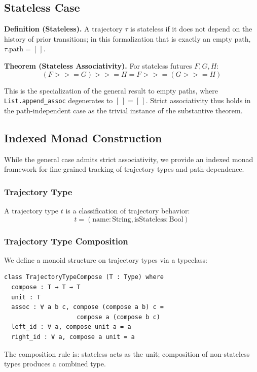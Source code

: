 \documentclass[11pt,a4paper]{article}
\newcommand{\seqBind}{\mathbin{>>=}}
\begin{document}
\subsection{Stateless Case}

\textbf{Definition (Stateless).} A trajectory $\tau$ is stateless if it does
not depend on the history of prior transitions; in this formalization that is
exactly an empty path, $\tau.\text{path} = [\,]$.

\textbf{Theorem (Stateless Associativity).} For stateless futures $F, G, H$:
\[
(F \seqBind G) \seqBind H = F \seqBind (G \seqBind H)
\]

This is the specialization of the general result to empty paths, where
\texttt{List.append\_assoc} degenerates to $[\,] = [\,]$. Strict associativity
thus holds in the path-independent case as the trivial instance of the
substantive theorem.

\subsection{Indexed Monad Construction}

While the general case admits strict associativity, we provide an indexed monad framework for fine-grained tracking of trajectory types and path-dependence.

\subsubsection{Trajectory Type}

A trajectory type $t$ is a classification of trajectory behavior:
\[
t = (\text{name} : \text{String}, \text{isStateless} : \text{Bool})
\]

\subsubsection{Trajectory Type Composition}

We define a monoid structure on trajectory types via a typeclass:
\begin{lstlisting}
class TrajectoryTypeCompose (T : Type) where
  compose : T → T → T
  unit : T
  assoc : ∀ a b c, compose (compose a b) c = 
                    compose a (compose b c)
  left_id : ∀ a, compose unit a = a
  right_id : ∀ a, compose a unit = a
\end{lstlisting}

The composition rule is: stateless acts as the unit; composition of non-stateless types produces a combined type.
\end{document}
